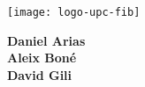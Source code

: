 
\thispagestyle{empty}
\clearpage
\setcounter{page}{-1}

\makeatletter
\begin{titlepage}
{
    \centering
    \texttt{[image: logo-upc-fib]}
    \null%
    \vspace{3em}
    {\Huge \bfseries \@title{} \par}
    \vspace{3em}
    {\large \scshape \@date{} \par}

    \vfill
    {\raggedleft{} \large \bfseries
    Daniel Arias \\
    Aleix Boné \\
    David Gili
    \par}
    \vspace{1em}
    \null%
}
\end{titlepage}
\makeatother

